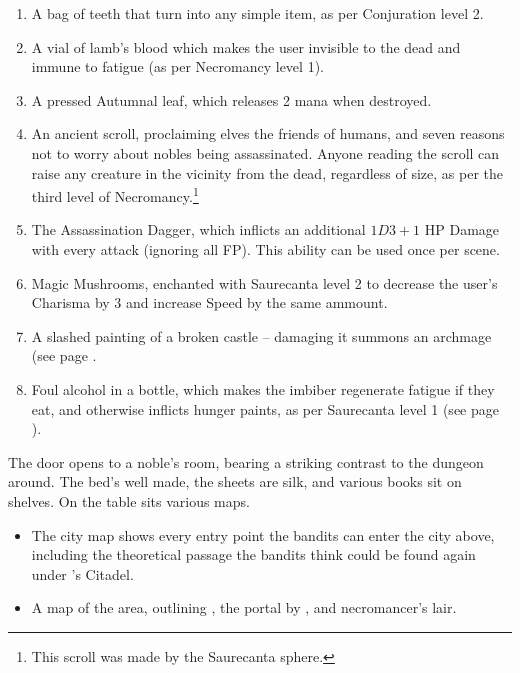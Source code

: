 \begin{multicols}{2}
\begin{enumerate}
	\item{A bag of teeth that turn into any simple item, as per Conjuration level 2.}
	\item{A vial of lamb's blood which makes the user invisible to the dead and immune to fatigue (as per Necromancy level 1).}
	\item{A pressed Autumnal leaf, which releases 2 mana when destroyed.}
	\item{An ancient scroll, proclaiming elves the friends of humans, and seven reasons not to worry about nobles being assassinated.  Anyone reading the scroll can raise any creature in the vicinity from the dead, regardless of size, as per the third level of Necromancy.\footnote{This scroll was made by the Saurecanta sphere.}}
	\item{The Assassination Dagger, which inflicts an additional $1D3+1$ HP Damage with every attack (ignoring all FP).  This ability can be used once per scene.}
	\item{Magic Mushrooms, enchanted with Saurecanta level 2 to decrease the user's Charisma by 3 and increase Speed by the same ammount.}
	\item{A slashed painting of a broken castle -- damaging it summons an archmage (see page \pageref{archmage}.}
	\item{Foul alcohol in a bottle, which makes the imbiber regenerate fatigue if they eat, and otherwise inflicts hunger paints, as per Saurecanta level 1 (see page \pageref{saurecantaone}).}
\end{enumerate}


\begin{boxtext}
	The door opens to a noble's room, bearing a striking contrast to the dungeon around.  The bed's well made, the sheets are silk, and various books sit on shelves.  On the table sits various maps.
\end{boxtext}

\begin{itemize}

	\item{The city map shows every entry point the bandits can enter the city above, including the theoretical passage the bandits think could be found again under 's Citadel.}

	\item{A map of the area, outlining , the portal by , and \gls{necromancer}'s lair.}


\end{itemize}
\end{multicols}
